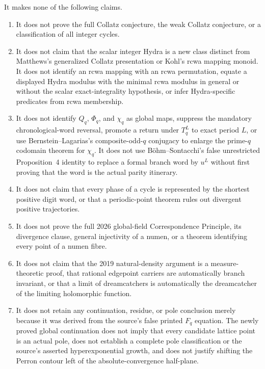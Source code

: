 It makes none of the following claims.
\begin{enumerate}[label=\textup{(N\arabic*)}]
\item It does not prove the full Collatz conjecture, the weak Collatz
      conjecture, or a classification of all integer cycles.
\item It does not claim that the scalar integer Hydra is a new class distinct
      from Matthews's generalized Collatz presentation or Kohl's rcwa mapping
      monoid.  It does not identify an rcwa mapping with an rcwa permutation,
      equate a displayed Hydra modulus with the minimal rcwa modulus in
      general or without the scalar exact-integrality hypothesis, or infer
      Hydra-specific predicates from rcwa membership.
\item It does not identify $Q_q$, $\Phi_q$, and $\chi_q$ as global maps,
      suppress the mandatory chronological-word reversal, promote a return
      under $T_q^L$ to exact period $L$, or use Bernstein--Lagarias's
      composite-odd-$q$ conjugacy to enlarge the prime-$q$ codomain theorem
      for $\chi_q$.  It does not use B\"ohm--Sontacchi's false unrestricted
      Proposition~4 identity to replace a formal branch word by $u^L$ without
      first proving that the word is the actual parity itinerary.
\item It does not claim that every phase of a cycle is represented by the
      shortest positive digit word, or that a periodic-point theorem rules
      out divergent positive trajectories.
\item It does not prove the full 2026 global-field Correspondence Principle,
      its divergence clause, general injectivity of a numen, or a theorem
      identifying every point of a numen fibre.
\item It does not claim that the 2019 natural-density argument is a measure-
      theoretic proof, that rational edgepoint carriers are automatically
      branch invariant, or that a limit of dreamcatchers is automatically the
      dreamcatcher of the limiting holomorphic function.
\item It does not retain any continuation, residue, or pole conclusion
      merely because it was derived from the source's false printed $F_q$
      equation.  The newly proved global continuation does not imply that
      every candidate lattice point is an actual pole, does not establish a
      complete pole classification or the source's asserted
      hyperexponential growth, and does not justify shifting the Perron
      contour left of the absolute-convergence half-plane.

\end{enumerate}
